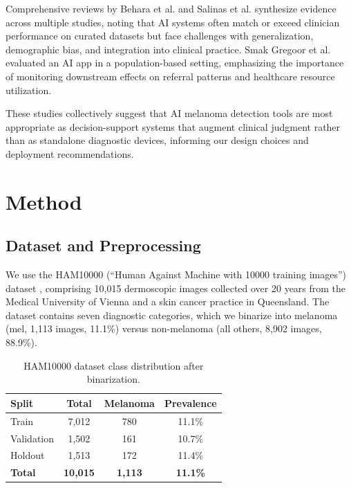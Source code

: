 \documentclass[conference]{IEEEtran}
\begin{document}
Comprehensive reviews by Behara et al. \cite{behara2024ai} and Salinas et al. \cite{salinas2024systematic} synthesize evidence across multiple studies, noting that AI systems often match or exceed clinician performance on curated datasets but face challenges with generalization, demographic bias, and integration into clinical practice. Smak Gregoor et al. \cite{smakgregoor2023ai} evaluated an AI app in a population-based setting, emphasizing the importance of monitoring downstream effects on referral patterns and healthcare resource utilization.

These studies collectively suggest that AI melanoma detection tools are most appropriate as decision-support systems that augment clinical judgment rather than as standalone diagnostic devices, informing our design choices and deployment recommendations.

\section{Method}

\subsection{Dataset and Preprocessing}

We use the HAM10000 (``Human Against Machine with 10000 training images'') dataset \cite{tschandl2018ham10000}, comprising 10,015 dermoscopic images collected over 20 years from the Medical University of Vienna and a skin cancer practice in Queensland. The dataset contains seven diagnostic categories, which we binarize into melanoma (mel, 1,113 images, 11.1\%) versus non-melanoma (all others, 8,902 images, 88.9\%).

\begin{table}[t]
\centering
\caption{HAM10000 dataset class distribution after binarization.}
\label{tab:dataset}
\begin{tabular}{lccc}
\toprule
\textbf{Split} & \textbf{Total} & \textbf{Melanoma} & \textbf{Prevalence} \\
\midrule
Train & 7,012 & 780 & 11.1\% \\
Validation & 1,502 & 161 & 10.7\% \\
Holdout & 1,513 & 172 & 11.4\% \\
\midrule
\textbf{Total} & \textbf{10,015} & \textbf{1,113} & \textbf{11.1\%} \\
\bottomrule
\end{tabular}
\end{table}
\end{document}
